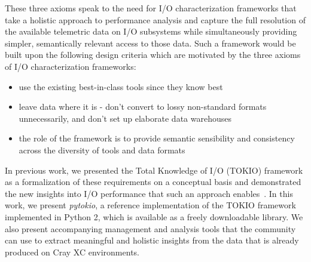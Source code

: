 These three axioms speak to the need for I/O characterization frameworks that take a holistic approach to performance analysis and capture the full resolution of the available telemetric data on I/O subsystems while simultaneously providing simpler, semantically relevant access to those data.
Such a framework would be built upon the following design criteria which are motivated by the three axioms of I/O characterization frameworks:

\begin{itemize}[leftmargin=*]
\item use the existing best-in-class tools since they know best

\item leave data where it is - don't convert to lossy non-standard formats unnecessarily, and don't set up elaborate data warehouses

\item the role of the framework is to provide semantic sensibility and consistency across the diversity of tools and data formats
\end{itemize}

In previous work, we presented the Total Knowledge of I/O (TOKIO) framework as a formalization of these requirements on a conceptual basis and demonstrated the new insights into I/O performance that such an approach enables~\cite{Lockwood2017}.
In this work, we present \emph{pytokio}, a reference implementation of the TOKIO framework implemented  in Python 2, which is available as a freely downloadable library.
We also present accompanying management and analysis tools that the community can use to extract meaningful and holistic insights from the data that is already produced on Cray XC environments.